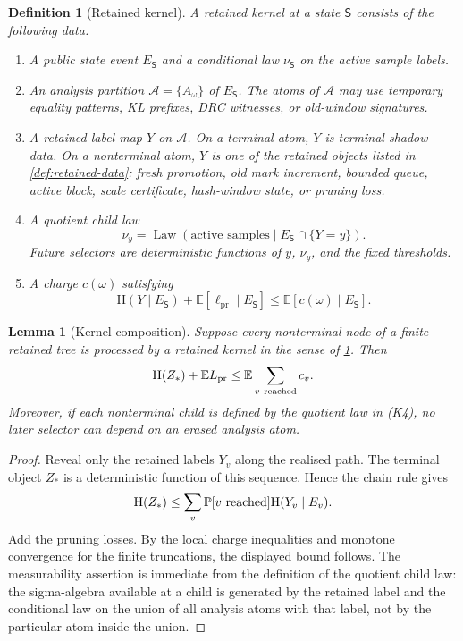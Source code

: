 \documentclass[11pt]{article}
\newcommand{\Cref}[1]{\ref{#1}}
\newtheorem{lemma}[theorem]{Lemma}
\newtheorem{definition}[theorem]{Definition}
\theoremstyle{remark}
\newcommand{\E}{\mathbb E}
\newcommand{\Prob}{\mathbb P}
\newcommand{\HH}{\mathrm H}
\newcommand{\Law}{\operatorname{Law}}
\newcommand{\State}{\mathsf S}
\newcommand{\pr}{\mathrm{pr}}
\begin{document}
\begin{definition}[Retained kernel]\label{def:retained-kernel}
A retained kernel at a state $\State$ consists of the following data.
\begin{enumerate}[label=\textup{(K\arabic*)}]
\item A public state event $E_\State$ and a conditional law $\nu_\State$ on the active sample labels.
\item An analysis partition $\mathcal A=\{A_\omega\}$ of $E_\State$.  The atoms of $\mathcal A$ may use temporary equality patterns, KL prefixes, DRC witnesses, or old-window signatures.
\item A retained label map $Y$ on $\mathcal A$.  On a terminal atom, $Y$ is terminal shadow data.  On a nonterminal atom, $Y$ is one of the retained objects listed in \Cref{def:retained-data}: fresh promotion, old mark increment, bounded queue, active block, scale certificate, hash-window state, or pruning loss.
\item A quotient child law
\[
        \nu_y=\Law(\text{active samples}\mid E_\State\cap\{Y=y\}).
\]
Future selectors are deterministic functions of $y$, $\nu_y$, and the fixed thresholds.
\item A charge $c(\omega)$ satisfying
\[
        \HH(Y\mid E_\State)+\E[\ell_{\pr}\mid E_\State]
        \le \E[c(\omega)\mid E_\State].
\]
\end{enumerate}
\end{definition}

\begin{lemma}[Kernel composition]\label{lem:kernel-composition}
Suppose every nonterminal node of a finite retained tree is processed by a retained kernel in the sense of \Cref{def:retained-kernel}.  Then
\[
        \HH(Z_*)+\E L_{\pr}\le \E\sum_{v\ {\rm reached}} c_v.
\]
Moreover, if each nonterminal child is defined by the quotient law in \textup{(K4)}, no later selector can depend on an erased analysis atom.
\end{lemma}

\begin{proof}
Reveal only the retained labels $Y_v$ along the realised path.  The terminal object $Z_*$ is a deterministic function of this sequence.  Hence the chain rule gives
\[
        \HH(Z_*)\le \sum_v \Prob[v\ {\rm reached}]\HH(Y_v\mid E_v).
\]
Add the pruning losses.  By the local charge inequalities and monotone convergence for the finite truncations, the displayed bound follows.  The measurability assertion is immediate from the definition of the quotient child law: the sigma-algebra available at a child is generated by the retained label and the conditional law on the union of all analysis atoms with that label, not by the particular atom inside the union.
\end{proof}
\end{document}
